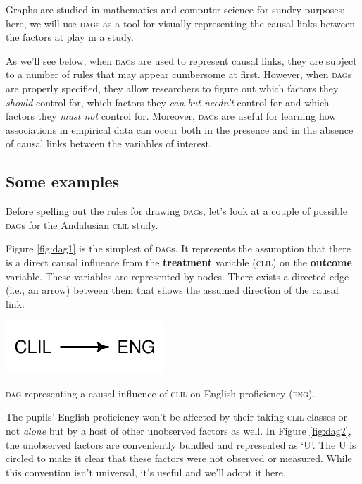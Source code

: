 \documentclass[a4paper]{tufte-book}\usepackage[]{graphicx}\usepackage[]{xcolor}
\newcommand{\term}[1]{\textbf{#1}}
\begin{document}
Graphs are studied in mathematics and computer science
for sundry purposes; here, we will use \textsc{dag}s as a tool
for visually representing the causal links
between the factors at play in a study.

As we'll see below, when \textsc{dag}s are used to represent causal links,
they are subject to a number of rules that may appear cumbersome at first. 
However, when \textsc{dag}s are properly specified, 
they allow researchers to figure out which factors they \emph{should} control for, 
which factors they \emph{can but needn't} control for 
and which factors they \emph{must not} control for. 
Moreover, \textsc{dag}s are useful for learning how associations in empirical data can occur
both in the presence and in the absence of causal links between the variables of interest.

\subsection{Some examples}
Before spelling out the rules for drawing \textsc{dag}s, let's look at a couple of
possible \textsc{dag}s for the Andalusian \textsc{clil} study.

Figure \ref{fig:dag1} is the simplest of \textsc{dag}s. It represents the assumption
that there is a direct causal influence from the \term{treatment} variable
(\textsc{clil}) on the \term{outcome} variable. These variables are represented by
nodes. There exists a directed edge (i.e., an arrow) between them that
shows the assumed direction of the causal link.



\begin{marginfigure}
  \centering
  \includegraphics{figure/dag-clileng-1}
  \caption{\textsc{dag} representing a causal influence of \textsc{clil} on English proficiency (\textsc{eng}).}
  \label{fig:dag1}
\end{marginfigure}

The pupils' English proficiency won't be affected by their taking \textsc{clil} classes or not \emph{alone} but by a host of other unobserved factors as well. In
Figure \ref{fig:dag2}, the unobserved factors are conveniently bundled and represented as `U'.
The U is circled to make it clear that these factors were not observed or measured.
While this convention isn't universal, it's useful and we'll adopt it here.
\end{document}
